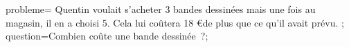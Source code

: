 \documentclass[exercice]{thedocument}%
\begin{document}
%
    \>probleme={%
        Quentin voulait s'acheter 3 bandes dessinées mais une fois au magasin,
        il en a choisi 5. Cela lui coûtera 18 \euro de plus que ce qu'il
        avait prévu.%
    };%
    \>question=Combien coûte une bande dessinée~?;%
\end{document}
